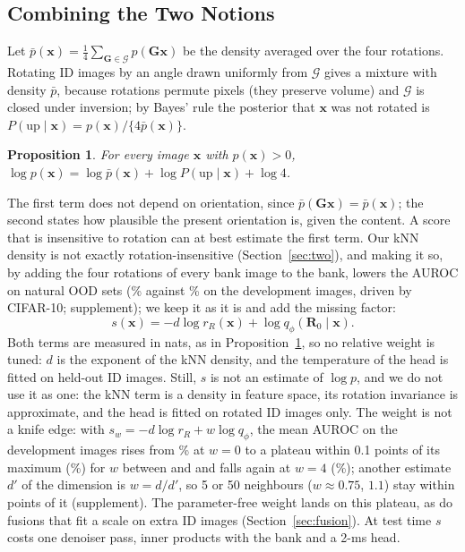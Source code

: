 \documentclass{article}
\newtheorem{proposition}{Proposition}
\newcommand{\Rot}[1]{\mathbf{R}_{#1}}
\newcommand{\mG}{\mathcal{G}}
\newcommand{\up}{\mathrm{up}}
\begin{document}
\subsection{Combining the Two Notions}
\label{sec:decomp}
Let $\bar p(\mathbf{x})=\frac{1}{4}\sum_{\mathbf{G}\in\mG}p(\mathbf{G}\mathbf{x})$ be the density averaged over the four rotations. Rotating ID images by an angle drawn uniformly from $\mG$ gives a mixture with density $\bar p$, because rotations permute pixels (they preserve volume) and $\mG$ is closed under inversion; by Bayes' rule the posterior that $\mathbf{x}$ was not rotated is $P(\up\mid\mathbf{x})=p(\mathbf{x})/\{4\bar p(\mathbf{x})\}$.
\begin{proposition}
\label{prop:decomp}
For every image $\mathbf{x}$ with $p(\mathbf{x})>0$, $\log p(\mathbf{x})=\log\bar p(\mathbf{x})+\log P(\up\mid\mathbf{x})+\log 4$.
\end{proposition}
The first term does not depend on orientation, since $\bar p(\mathbf{G}\mathbf{x})=\bar p(\mathbf{x})$; the second states how plausible the present orientation is, given the content. A score that is insensitive to rotation can at best estimate the first term. Our kNN density is not exactly rotation-insensitive (Section~\ref{sec:two}), and making it so, by adding the four rotations of every bank image to the bank, lowers the AUROC on natural OOD sets (\abNatF\% against \abNatA\% on the development images, driven by CIFAR-10; supplement); we keep it as it is and add the missing factor:
\begin{equation}
s(\mathbf{x})=-d\log r_R(\mathbf{x})+\log q_\phi(\Rot{0}\mid\mathbf{x}).
\label{eq:score}
\end{equation}
Both terms are measured in nats, as in Proposition~\ref{prop:decomp}, so no relative weight is tuned: $d$ is the exponent of the kNN density, and the temperature of the head is fitted on held-out ID images. Still, $s$ is not an estimate of $\log p$, and we do not use it as one: the kNN term is a density in feature space, its rotation invariance is approximate, and the head is fitted on rotated ID images only. The weight is not a knife edge: with $s_w=-d\log r_R+w\log q_\phi$, the mean AUROC on the development images rises from \swZero\% at $w=0$ to a plateau within 0.1 points of its maximum (\swBest\%) for $w$ between \swLo{} and \swHi{} and falls again at $w=4$ (\swFour\%); another estimate $d'$ of the dimension is $w=d/d'$, so 5 or 50 neighbours ($w\approx0.75$, $1.1$) stay within \swDprimeGap{} points of it (supplement). The parameter-free weight lands on this plateau, as do fusions that fit a scale on extra ID images (Section~\ref{sec:fusion}). At test time $s$ costs one denoiser pass, inner products with the bank and a 2-ms head.
\end{document}
